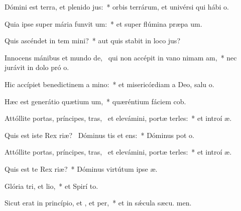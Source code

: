 \item Dómini est terra, et plenido jus:~* orbis terrárum, et univérsi qui hábi  o.
\item Quia ipse super mária funvit um:~* et super flúmina præpa um.
\item Quis ascéndet in tem mini?~* aut quis stabit in loco  jus?
\item Innocens mánibus et mundo de,~\pscross{} qui non accépit in vano nimam am,~* nec jurávit in dolo pró o.
\item Hic accípiet benedictinem a mino:~* et misericórdiam a Deo, salu o.
\item Hæc est generátio quætium um,~* quæréntium fáciem  cob.
\item Attóllite portas, príncipes, tras,~\pscross{} et elevámini, portæ terles:~* et introí  æ.
\item Quis est iste Rex riæ?~\pscross{} Dóminus tis et ens:~* Dóminus pot  o.
\item Attóllite portas, príncipes, tras,~\pscross{} et elevámini, portæ terles:~* et introí  æ.
\item Quis est te Rex riæ?~* Dóminus virtútum ipse   æ.
\item Glória tri, et lio,~* et Spirí to.
\item Sicut erat in princípio, et , et per,~* et in sǽcula sæcu. men.

